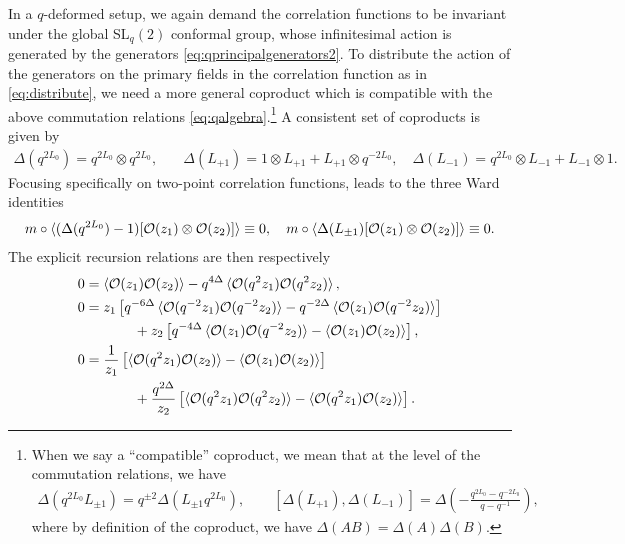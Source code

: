 \documentclass[a4paper,titlepage,12pt]{article}
\numberwithin{equation}{section}
\begin{document}
In a $q$-deformed setup, we again demand the correlation functions to be invariant under the global SL$_q(2)$ conformal group, whose infinitesimal action is generated by the generators \eqref{eq:qprincipalgenerators2}. To distribute the action of the generators on the primary fields in the correlation function as in \eqref{eq:distribute}, we need a more general coproduct which is compatible with the above commutation relations \eqref{eq:qalgebra}.\footnote{When we say a ``compatible'' coproduct, we mean that at the level of the commutation relations, we have 
\begin{align}
\Delta(q^{2L_0}L_{\pm1})=q^{\pm2}\Delta(L_{\pm1}q^{2L_0}),\qquad [\Delta(L_{+1}),\Delta(L_{-1})]=\Delta\left(-\frac{q^{2L_0}-q^{-2L_0}}{q-q^{-1}}\right),
\end{align} 
where by definition of the coproduct, we have $\Delta(AB)=\Delta(A)\Delta(B)$.} A consistent set of coproducts is given by 
\begin{align}
    \Delta(q^{2L_0}) = q^{2L_0} \otimes q^{2L_0}, &\quad \Delta(L_{+1}) =1 \otimes L_{+1} + L_{+1} \otimes q^{-2L_0}, \quad \Delta(L_{-1}) =  q^{2L_0} \otimes L_{-1} + L_{-1} \otimes 1.
\end{align} 
Focusing specifically on two-point correlation functions, leads to the three Ward identities 
\begin{align}
\label{eq:qward}
    m\circ\braket{(\Delta(q^{2L_0})-1)[\mathcal{O}(z_1)\otimes\mathcal{O}(z_2)]}\equiv 0, \quad m\circ\braket{\Delta(L_{\pm1})[\mathcal{O}(z_1)\otimes\mathcal{O}(z_2)]}\equiv 0.
\end{align}  
The explicit recursion relations are then respectively 
\begin{align}
    &0=\braket{\mathcal{O}(z_1)\mathcal{O}(z_2)}-q^{4\Delta}\braket{\mathcal{O}(q^2z_1)\mathcal{O}(q^{2}z_2)},\\
    &0=z_1\left[q^{-6\Delta}\braket{\mathcal{O}(q^{-2}z_1)\mathcal{O}(q^{-2}z_2)}-q^{-2\Delta}\braket{\mathcal{O}(z_1)\mathcal{O}(q^{-2}z_2)}\right] \nonumber \\&\qquad \qquad+z_2\left[q^{-4\Delta}\braket{\mathcal{O}(z_1)\mathcal{O}(q^{-2}z_2)}-\braket{\mathcal{O}(z_1)\mathcal{O}(z_2)}\right], \\&0=\frac{1}{z_1}\left[\braket{\mathcal{O}(q^2z_1)\mathcal{O}(z_2)}-\braket{\mathcal{O}(z_1)\mathcal{O}(z_2)}\right] \nonumber \\&\qquad \qquad+\frac{q^{2\Delta}}{z_2}\left[\braket{\mathcal{O}(q^2z_1)\mathcal{O}(q^{2}z_2)}-\braket{\mathcal{O}(q^2z_1)\mathcal{O}(z_2)}\right].
\end{align}
\end{document}
